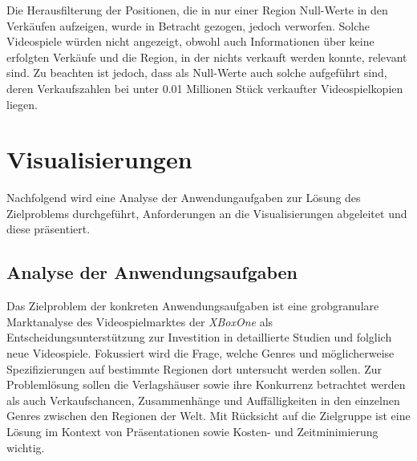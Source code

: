 \documentclass[usegeometry=true]{scrartcl}
\begin{document}
Die Herausfilterung der Positionen, die in nur einer Region Null-Werte in den Verkäufen aufzeigen, wurde in Betracht gezogen, jedoch verworfen.
Solche Videospiele würden nicht angezeigt, obwohl auch Informationen über keine erfolgten Verkäufe und die Region, in der nichts verkauft werden konnte, relevant sind. 
Zu beachten ist jedoch, dass als Null-Werte auch solche aufgeführt sind, deren Verkaufszahlen bei unter 0.01 Millionen Stück verkaufter Videospielkopien liegen. 

\section{Visualisierungen}
Nachfolgend wird eine Analyse der Anwendungaufgaben zur Lösung des Zielproblems durchgeführt, Anforderungen an die Visualisierungen abgeleitet und diese präsentiert.

\subsection{Analyse der Anwendungsaufgaben}
Das Zielproblem der konkreten Anwendungsaufgaben ist eine grobgranulare Marktanalyse des Videospielmarktes der \textit{XBoxOne} 
als Entscheidungsunterstützung zur Investition in detaillierte Studien und folglich neue Videospiele. 
Fokussiert wird die Frage, welche Genres und möglicherweise Spezifizierungen auf bestimmte Regionen dort untersucht werden sollen. 
Zur Problemlösung sollen die Verlagshäuser sowie ihre Konkurrenz betrachtet werden als auch Verkaufschancen, Zusammenhänge und Auffälligkeiten in den einzelnen Genres zwischen den Regionen der Welt. 
Mit Rücksicht auf die Zielgruppe ist eine Lösung im Kontext von Präsentationen sowie Kosten- und Zeitminimierung wichtig. 
\end{document}
